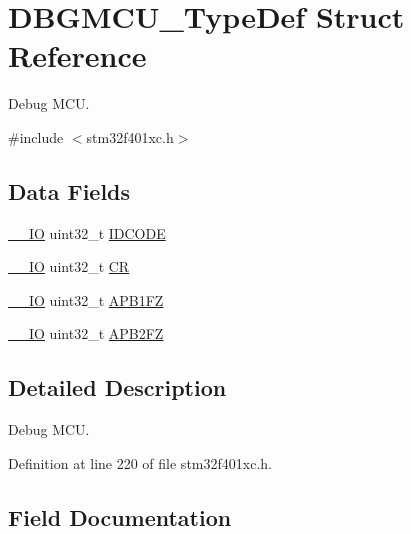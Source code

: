 \hypertarget{struct_d_b_g_m_c_u___type_def}{}\section{D\+B\+G\+M\+C\+U\+\_\+\+Type\+Def Struct Reference}
\label{struct_d_b_g_m_c_u___type_def}


Debug M\+CU.  




{\ttfamily \#include $<$stm32f401xc.\+h$>$}

\subsection*{Data Fields}
\begin{DoxyCompactItemize}
\item 
\hyperlink{core__sc300_8h_aec43007d9998a0a0e01faede4133d6be}{\+\_\+\+\_\+\+IO} uint32\+\_\+t \hyperlink{struct_d_b_g_m_c_u___type_def_a24df28d0e440321b21f6f07b3bb93dea}{I\+D\+C\+O\+DE}
\item 
\hyperlink{core__sc300_8h_aec43007d9998a0a0e01faede4133d6be}{\+\_\+\+\_\+\+IO} uint32\+\_\+t \hyperlink{struct_d_b_g_m_c_u___type_def_ab40c89c59391aaa9d9a8ec011dd0907a}{CR}
\item 
\hyperlink{core__sc300_8h_aec43007d9998a0a0e01faede4133d6be}{\+\_\+\+\_\+\+IO} uint32\+\_\+t \hyperlink{struct_d_b_g_m_c_u___type_def_a5eaefc557573ae7bdc632ef6b6d574b5}{A\+P\+B1\+FZ}
\item 
\hyperlink{core__sc300_8h_aec43007d9998a0a0e01faede4133d6be}{\+\_\+\+\_\+\+IO} uint32\+\_\+t \hyperlink{struct_d_b_g_m_c_u___type_def_a4628a8c32f97ef93b15b2b503ef90c75}{A\+P\+B2\+FZ}
\end{DoxyCompactItemize}


\subsection{Detailed Description}
Debug M\+CU. 

Definition at line 220 of file stm32f401xc.\+h.



\subsection{Field Documentation}
